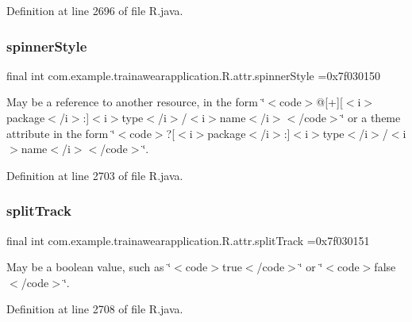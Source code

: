 Definition at line 2696 of file R.\+java.

\mbox{\label{classcom_1_1example_1_1trainawearapplication_1_1_r_1_1attr_a2ca6d39b9e2f4152353d2d8038e771f8}} 
\subsubsection{\texorpdfstring{spinnerStyle}{spinnerStyle}}
{\footnotesize\ttfamily final int com.\+example.\+trainawearapplication.\+R.\+attr.\+spinner\+Style =0x7f030150\hspace{0.3cm}{\ttfamily [static]}}

May be a reference to another resource, in the form \char`\"{}$<$code$>$@\mbox{[}+\mbox{]}\mbox{[}$<$i$>$package$<$/i$>$\+:\mbox{]}$<$i$>$type$<$/i$>$/$<$i$>$name$<$/i$>$$<$/code$>$\char`\"{} or a theme attribute in the form \char`\"{}$<$code$>$?\mbox{[}$<$i$>$package$<$/i$>$\+:\mbox{]}$<$i$>$type$<$/i$>$/$<$i$>$name$<$/i$>$$<$/code$>$\char`\"{}. 

Definition at line 2703 of file R.\+java.

\mbox{\label{classcom_1_1example_1_1trainawearapplication_1_1_r_1_1attr_a2612dc2dd334b1f025ccc53a49b8c037}} 
\subsubsection{\texorpdfstring{splitTrack}{splitTrack}}
{\footnotesize\ttfamily final int com.\+example.\+trainawearapplication.\+R.\+attr.\+split\+Track =0x7f030151\hspace{0.3cm}{\ttfamily [static]}}

May be a boolean value, such as \char`\"{}$<$code$>$true$<$/code$>$\char`\"{} or \char`\"{}$<$code$>$false$<$/code$>$\char`\"{}. 

Definition at line 2708 of file R.\+java.

